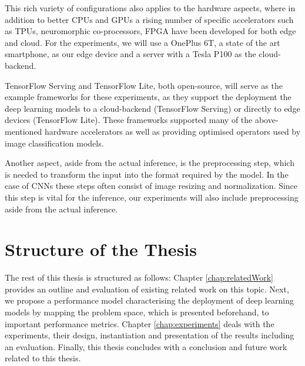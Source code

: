 This rich variety of configurations also applies to the hardware aspects, where in addition to better CPUs and GPUs a rising number of specific accelerators such as TPUs, neuromorphic co-processors, FPGA have been developed for both edge and cloud.
For the experiments, we will use a OnePlus 6T, a state of the art smartphone, as our edge device and a server with a Tesla P100 as the cloud-backend.


TensorFlow Serving and TensorFlow Lite, both open-source, will serve as the example frameworks for these experiments, as they support the deployment the deep learning models to a cloud-backend (TensorFlow Serving) or directly to edge devices (TensorFlow Lite). These frameworks supported many of the above-mentioned hardware accelerators as well as providing optimised operators used by image classification models.

Another aspect, aside from the actual inference, is the preprocessing step, which is needed to transform the input into the format required by the model. 
In the case of CNNs these steps often consist of image resizing and normalization.
Since this step is vital for the inference, our experiments will also include preprocessing aside from the actual inference.

\section{Structure of the Thesis}
The rest of this thesis is structured as follows: Chapter \ref{chap:relatedWork} provides an outline and evaluation of existing related work on this topic. Next, we propose a performance model characterising the deployment of deep learning models by mapping the problem space, which is presented beforehand, to important performance metrics.
Chapter \ref{chap:experiments} deals with the experiments, their design, instantiation and presentation of the results including an evaluation.
Finally, this thesis concludes with a conclusion and future work related to this thesis.

